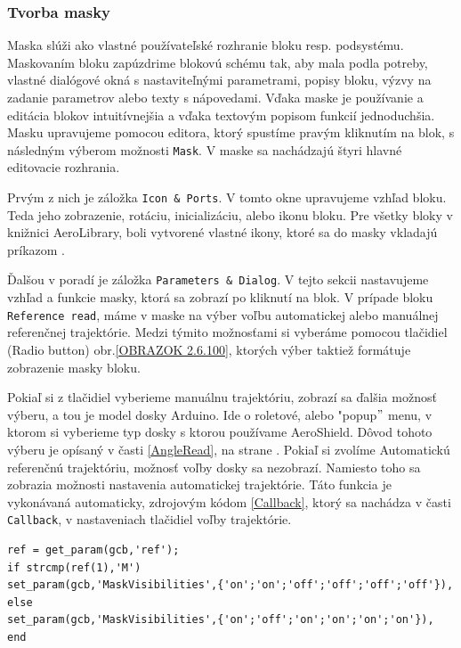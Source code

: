 \newpage
\subsubsection{Tvorba masky}
\label{Maska}

Maska slúži ako vlastné používateľské rozhranie bloku resp. podsystému. Maskovaním bloku zapúzdrime blokovú schému tak, aby mala podla potreby, vlastné dialógové okná s nastaviteľnými parametrami, popisy bloku, výzvy na zadanie parametrov alebo texty s nápovedami. Vďaka maske je používanie a editácia blokov intuitívnejšia a vďaka textovým popisom funkcií jednoduchšia. Masku upravujeme pomocou editora, ktorý spustíme pravým kliknutím na blok, s následným výberom možnosti \verb|Mask|. V maske sa nachádzajú štyri hlavné editovacie rozhrania. 

Prvým z nich je záložka \verb|Icon & Ports|. V tomto okne upravujeme vzhľad bloku. Teda jeho zobrazenie, rotáciu, inicializáciu, alebo ikonu bloku. Pre všetky bloky v knižnici AeroLibrary, boli vytvorené vlastné ikony, ktoré sa do masky vkladajú príkazom .

Ďalšou v poradí je záložka \verb|Parameters & Dialog|. V tejto sekcii nastavujeme vzhľad a funkcie masky, ktorá sa zobrazí po kliknutí na blok. V prípade bloku \verb|Reference read|, máme v maske na výber voľbu automatickej alebo manuálnej referenčnej trajektórie. Medzi týmito možnosťami si vyberáme pomocou tlačidiel (Radio button) obr.\ref{OBRAZOK 2.6.100}, ktorých výber taktiež formátuje zobrazenie masky bloku. 

Pokiaľ si z tlačidiel vyberieme manuálnu trajektóriu, zobrazí sa ďalšia možnosť výberu, a tou je model dosky Arduino. Ide o roletové, alebo "popup$"$ menu, v ktorom si vyberieme typ dosky s ktorou používame AeroShield. Dôvod tohoto výberu je opísaný v časti \ref{AngleRead}, na strane \pageref{AngleRead}. Pokiaľ si zvolíme Automatickú referenčnú trajektóriu, možnosť voľby dosky sa nezobrazí. Namiesto toho sa zobrazia možnosti nastavenia automatickej trajektórie. Táto funkcia je vykonávaná automaticky, zdrojovým kódom \ref{Callback}, ktorý sa nachádza v časti \verb|Callback|, v nastaveniach tlačidiel voľby trajektórie. 

\begin{lstlisting}[caption={Callback funkcia.},captionpos=b,label=Callback]
ref = get_param(gcb,'ref');
if strcmp(ref(1),'M')
set_param(gcb,'MaskVisibilities',{'on';'on';'off';'off';'off';'off'}),
else
set_param(gcb,'MaskVisibilities',{'on';'off';'on';'on';'on';'on'}),
end
\end{lstlisting}

